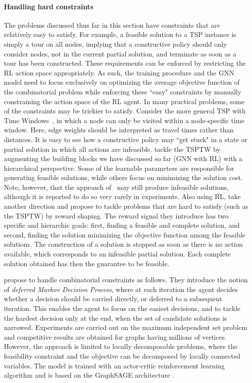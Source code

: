 \documentclass[twoside,11pt]{article}
\begin{document}
\paragraph{Handling hard constraints}
The problems discussed thus far in this section have constraints that are relatively easy to satisfy. For example, a feasible solution to a TSP instance is simply a tour on all nodes, implying that a constructive policy should only consider nodes, not in the current partial solution, and terminate as soon as a tour has been constructed. These requirements can be enforced by restricting the RL action space appropriately. As such, the training procedure and the GNN model need to focus exclusively on optimizing the average objective function of the combinatorial problem while enforcing these ``easy" constraints by manually constraining the action space of the RL agent. In many practical problems, some of the constraints may be trickier to satisfy. Consider the more general TSP with Time Windows~\citep[TSPTW]{savelsbergh1985local}, in which a node can only be visited within a node-specific time window. Here, edge weights should be interpreted as travel times rather than distances. It is easy to see how a constructive policy may ``get stuck" in a state or partial solution in which all actions are infeasible. \citet{ma2019combinatorial} tackle the TSPTW by augmenting the building blocks we have discussed so far (GNN with RL) with a {hierarchical} perspective. Some of the learnable parameters are responsible for generating feasible solutions, while others focus on minimizing the solution cost. Note, however, that the approach of~\cite{ma2019combinatorial} may still produce infeasible solutions, although it is reported to do so very rarely in experiments.
Also using RL, \citet{cappart2020combining} take another direction and propose to tackle problems that are hard to satisfy (such as the TSPTW) by reward shaping. The reward signal they introduce has two specific and hierarchic goals: first, finding a feasible and complete solution, and second, finding the solution minimizing the objective function among the feasible solutions.
The construction of a solution is stopped as soon as there is no action available, which corresponds to an infeasible partial solution. 
Each complete solution obtained has then the guarantee to be feasible.

\citet{ahn2020learning} propose to handle combinatorial constraints as follows.
They introduce the notion of \textit{deferred Markov Decision Process}, 
where at each iteration the agent decides whether a decision should be carried directly, or deferred to a subsequent iteration.
This enables the agent to focus on the easiest decisions, and to tackle the hardest decision only at the end, when the set of candidate solutions
is narrowed. Experiments are carried out on the maximum independent set problem and competitive results are obtained for graphs having millions of vertices.
However, the approach is limited to locally decomposable problems, 
where the feasibility constraint and the objective can be decomposed by locally connected variables. The model is trained with an actor-critic
reinforcement learning algorithm and is based on the GraphSAGE architecture \citep{Ham+2017}.
\end{document}
